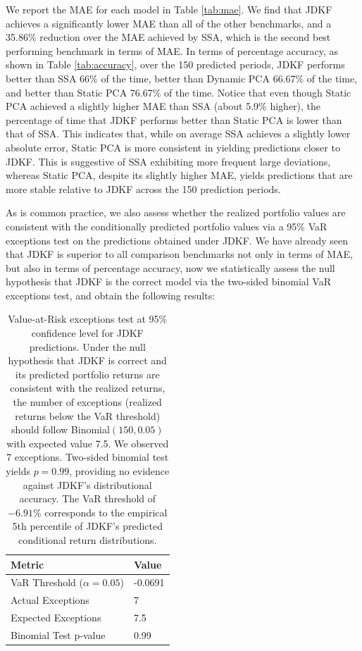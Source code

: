 \documentclass[11pt]{article}
\theoremstyle{plain}
\theoremstyle{definition}
\theoremstyle{remark}
\numberwithin{equation}{section}
\begin{document}
We report the MAE for each model in Table \ref{tab:mae}. We find that JDKF achieves a significantly lower MAE than all of the other benchmarks, and a 35.86\% reduction over the MAE achieved by SSA, which is the second best performing benchmark in terms of MAE. In terms of percentage accuracy, as shown in Table \ref{tab:accuracy}, over the 150 predicted periods, JDKF performs better than SSA 66\% of the time, better than Dynamic PCA 66.67\% of the time, and better than Static PCA 76.67\% of the time. Notice that even though Static PCA achieved a slightly higher MAE than SSA (about 5.9\% higher), the percentage of time that JDKF performs better than Static PCA is lower than that of SSA. This indicates that, while on average SSA achieves a slightly lower absolute error, Static PCA is more consistent in yielding predictions closer to JDKF. This is suggestive of SSA exhibiting more frequent large deviations, whereas Static PCA, despite its slightly higher MAE, yields predictions that are more stable relative to JDKF across the 150 prediction periods. 

As is common practice, we also assess whether the realized portfolio values are consistent with the conditionally predicted portfolio values via a 95\% VaR exceptions test on the predictions obtained under JDKF. We have already seen that JDKF is superior to all comparison benchmarks not only in terms of MAE, but also in terms of percentage accuracy, now we statistically assess the null hypothesis that JDKF is the correct model via the two-sided binomial VaR exceptions test, and obtain the following results:
\begin{table}[H]
    \centering
    \begin{tabular}{ll}
        \toprule
        \textbf{Metric} & \textbf{Value} \\
        \midrule
        VaR Threshold ($\alpha = 0.05$) & -0.0691\\
        Actual Exceptions & 7 \\
        Expected Exceptions & 7.5 \\
        Binomial Test p-value & 0.99\\ 
        \bottomrule
    \end{tabular}
    \caption{Value-at-Risk exceptions test at 95\% confidence level for JDKF predictions. Under the null hypothesis that JDKF is correct and its predicted portfolio returns are consistent with the realized returns, the number of exceptions (realized returns below 
the VaR threshold) should follow Binomial$(150, 0.05)$ with expected value 7.5. We observed 7 exceptions. Two-sided binomial test yields $p=0.99$, providing no evidence 
against JDKF's distributional accuracy. The VaR threshold of $-6.91\%$ corresponds to 
the empirical 5th percentile of JDKF's predicted conditional return distributions.}
\label{tab:var_results_95}
\end{table}
\end{document}
